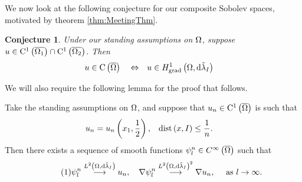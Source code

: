 \documentclass[11pt]{report}
\newcommand\labelthis{\addtocounter{equation}{1}\tag{\theequation}}
\newtheorem{conj}[theorem]{Conjecture}
\theoremstyle{plain}
\newcommand{\tlambda}{\tilde{\lambda}}
\newcommand{\C}[1]{\mathrm{C}^1\bracs{#1}}
\begin{document}
We now look at the following conjecture for our composite Sobolev spaces, motivated by theorem \ref{thm:MeetingThm}.
\begin{conj} \label{conj:CompMeasRegularity}
	Under our standing assumptions on $\Omega$, suppose $u\in \C{\overline{\ddom_1}}\cap \C{\overline{\ddom_2}}$.
	Then
	\begin{align*}
		u\in\mathrm{C}\bracs{\overline{\ddom}} \quad\Leftrightarrow\quad & u\in\gradSob{\ddom}{\tlambda_I}
	\end{align*}
\end{conj}

We will also require the following lemma for the proof that follows.
\begin{lemma} \label{lem:ConvolutionConvergence}
	Take the standing assumptions on $\Omega$, and suppose that $u_n\in\C{\overline{\ddom}}$ is such that
	\begin{align*}
		u_n = u_n\left( x_1,\frac{1}{2} \right), &\quad \mathrm{dist}\left( x,I \right)\leq\frac{1}{n}.
	\end{align*}	 
	Then there exists a sequence of smooth functions $\psi_l^n\in C^{\infty}\left( \overline{\Omega} \right)$ such that
	\begin{align*} \labelthis\label{eq:WantedConvoConvergences}
		\psi_l^n \lconv{\ltwo{\ddom}{\tlambda_I}} u_n, 
		\quad \grad\psi_l^n \lconv{\ltwo{\ddom}{\tlambda_I}^2} \grad u_n,
		\quad \toInfty{l}.
	\end{align*}
\end{lemma}
\end{document}
